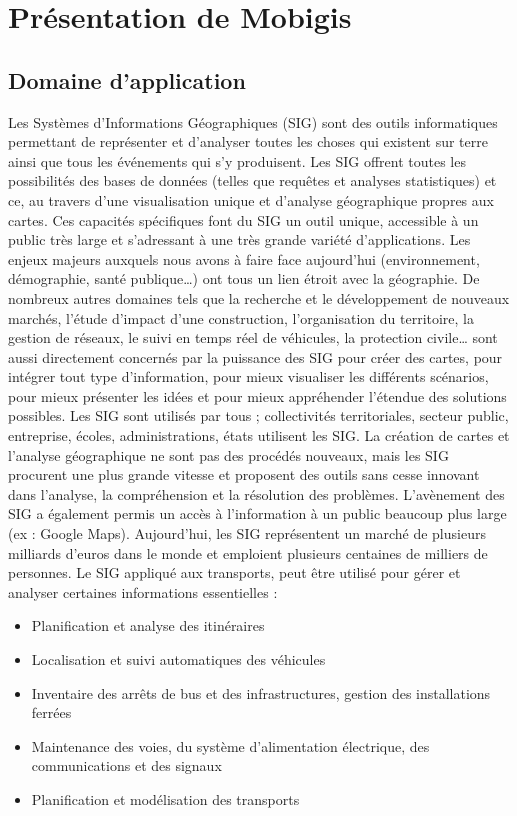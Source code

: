 \chapter{Présentation de Mobigis}
\label{PresentationEntreprise}

\section{Domaine d'application}\label{sig}

Les Systèmes d'Informations Géographiques (SIG) sont des outils informatiques permettant de représenter et d'analyser toutes les choses qui existent sur terre ainsi que tous les événements qui s'y produisent.
Les SIG offrent toutes les possibilités des bases de données (telles que requêtes et analyses statistiques) et ce, au travers d'une visualisation unique et d'analyse géographique propres aux cartes. Ces capacités spécifiques font du SIG un outil unique, accessible à un public très large et s'adressant à une très grande variété d'applications. 
Les enjeux majeurs auxquels nous avons à faire face aujourd'hui (environnement, démographie, santé publique…) ont tous un lien étroit avec la géographie. De nombreux autres domaines tels que la recherche et le développement de nouveaux marchés, l'étude d'impact d'une construction, l'organisation du territoire, la gestion de réseaux, le suivi en temps réel de véhicules, la protection civile… sont aussi directement concernés par la puissance des SIG pour créer des cartes, pour intégrer tout type d'information, pour mieux visualiser les différents scénarios, pour mieux présenter les idées et pour mieux appréhender l'étendue des solutions possibles.
Les SIG sont utilisés par tous ; collectivités territoriales, secteur public, entreprise, écoles, administrations, états utilisent les SIG. La création de cartes et l'analyse géographique ne sont pas des procédés nouveaux, mais les SIG procurent une plus grande vitesse et proposent des outils sans cesse innovant dans l'analyse, la compréhension et la résolution des problèmes.
L'avènement des SIG a également permis un accès à l'information à un public beaucoup plus large (ex : Google Maps). Aujourd'hui, les SIG représentent un marché de plusieurs milliards d'euros dans le monde et emploient plusieurs centaines de milliers de personnes. 
Le SIG appliqué aux transports, peut être utilisé pour gérer et analyser certaines informations essentielles :
\begin{itemize}
\item Planification et analyse des itinéraires 
\item Localisation et suivi automatiques des véhicules 
\item Inventaire des arrêts de bus et des infrastructures, gestion des installations ferrées 
\item Maintenance des voies, du système d'alimentation électrique, des communications et des signaux 
\item Planification et modélisation des transports
\end{itemize}

